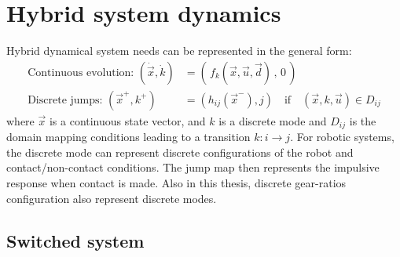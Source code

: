 

\section{Hybrid system dynamics}

Hybrid dynamical system needs can be represented in the general form:
%
\begin{align}
\text{Continuous evolution: } \left(  \dot{\vec{x}} , \dot{k} \right) &=  \left( \, f_k( \vec{x} , \vec{u} , \vec{d} ) \, , \, 0 \, \right) \\
\text{Discrete jumps: } \left(  \vec{x}^+ , k^+ \right) &=  \left( h_{ij}( \vec{x}^- ) , j \right) \quad\text{if}\quad \left(  \vec{x} , k , \vec{u} \right) \in D_{ij}  
\end{align}
%
where $\vec{x}$ is a continuous state vector, and $k$ is a discrete mode and $D_{ij}$ is the domain mapping conditions leading to a transition $k:i \rightarrow j$. For robotic systems, the discrete mode can represent discrete configurations of the robot and contact/non-contact conditions. The jump map then represents the impulsive response when contact is made. Also in this thesis, discrete gear-ratios configuration also represent discrete modes.

\subsection{Switched system}

